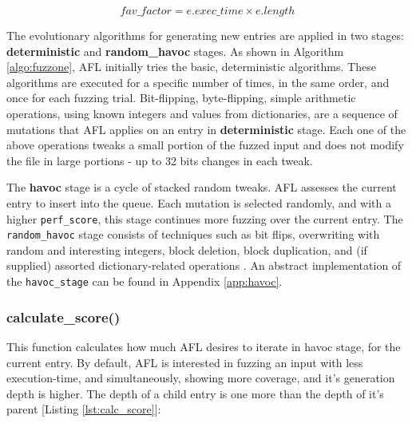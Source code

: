 \begin{equation}
    fav\_factor = e.exec\_time \times e.length
    \label{eq:afl_fav_fac}
\end{equation}


The evolutionary algorithms for generating new entries are applied in two stages: \textbf{deterministic} and \textbf{random\_havoc} stages. As shown in Algorithm \ref{algo:fuzzone}, AFL initially tries the basic, deterministic algorithms. These algorithms are executed for a specific number of times, in the same order, and once for each fuzzing trial. Bit-flipping, byte-flipping, simple arithmetic operations, using known integers and values from dictionaries, are a sequence of mutations that AFL applies on an entry in \textbf{deterministic} stage. Each one of the above operations tweaks a small portion of the fuzzed input and does not modify the file in large portions - up to 32 bits changes in each tweak.

The \textbf{havoc} stage is a cycle of stacked random tweaks. AFL assesses the current entry to insert into the queue. Each mutation is selected randomly, and with a higher \texttt{perf\_score}, this stage continues more fuzzing over the current entry. The \texttt{random\_havoc} stage consists of techniques such as bit flips, overwriting with random and interesting integers, block deletion, block duplication, and (if supplied) assorted dictionary-related operations \cite{afl_userguide}. An abstract implementation of the \texttt{havoc\_stage} can be found in Appendix \ref{app:havoc}.

\subsubsection{calculate\_score()}
\label{sub:calc_score}

This function calculates how much AFL desires to iterate in havoc stage, for the current entry. By default, AFL is interested in fuzzing an input with less execution-time, and simultaneously, showing more coverage, and it's generation depth is higher. The depth of a child entry is one more than the depth of it's parent [Listing \ref{lst:calc_score}]: 

